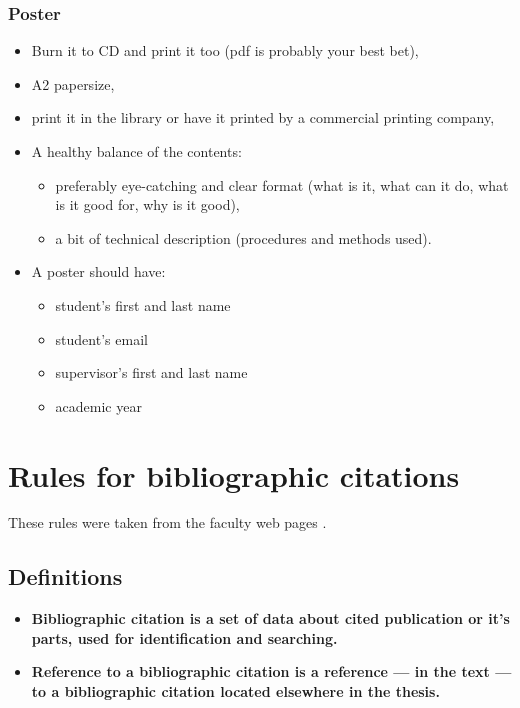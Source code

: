 \subsection*{Poster}
\begin{itemize}
  \item{Burn it to CD and print it too (pdf is probably your best bet),}
  \item{A2 papersize,}
  \item{print it in the library or have it printed by a commercial printing company,}
  \item{A healthy balance of the contents:
  \begin{itemize}
    \item{preferably eye-catching and clear format (what is it, what can it do, what is it good for, why is it good),}
    \item{a bit of technical description (procedures and methods used).}
  \end{itemize}}
  \item{A poster should have:}
  \begin{itemize}
  	\item{student's first and last name}
    \item{student's email}
    \item{supervisor's first and last name}
    \item{academic year}
  \end{itemize}
\end{itemize}

\chapter{Rules for bibliographic citations}
\label{citace}

These rules were taken from the faculty web pages \cite{citace}.

\section{Definitions}

\begin{itemize}
  \item{\bf Bibliographic citation \rm is a set of data about cited publication or it's parts, used for identification and searching.}
  \item{\bf Reference to a bibliographic citation \rm is a reference --- in the text --- to a bibliographic citation located elsewhere in the thesis.}
\end{itemize}

